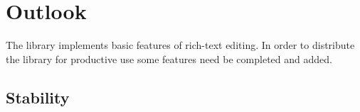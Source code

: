 





\chapter{Outlook}

The library implements basic features of rich-text editing. In order to distribute the library for productive use some features need be completed and added.

\section{Stability}

